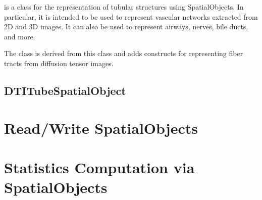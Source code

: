  is a class for the representation
of tubular structures using SpatialObjects.  In particular, it is intended
to be used to represent vascular networks extracted from 2D and 3D images.
It can also be used to represent airways, nerves, bile ducts, and more.

 The class  is derived from this class
and adds constructs for representing fiber tracts from diffusion tensor images.

\label{sec:TubeSpatialObject}



\subsection{DTITubeSpatialObject}
\label{sec:DTITubeSpatialObject}



\section{Read/Write SpatialObjects}
\label{sec:ReadWriteSpatialObjects}



\section{Statistics Computation via SpatialObjects}
\label{sec:SpatialObjectToImageStatisticsCalculator}

